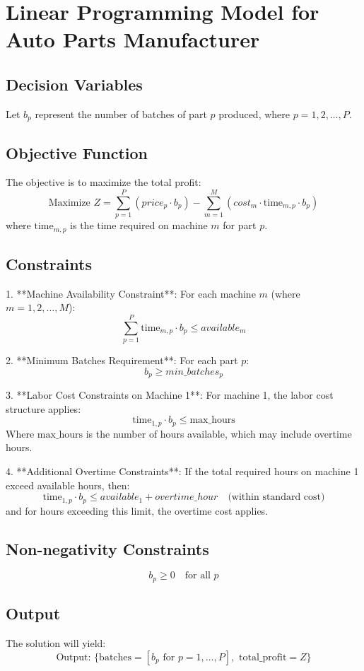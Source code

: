 \documentclass{article}
\begin{document}
\section*{Linear Programming Model for Auto Parts Manufacturer}

\subsection*{Decision Variables}
Let \( b_p \) represent the number of batches of part \( p \) produced, where \( p = 1, 2, \ldots, P \).

\subsection*{Objective Function}
The objective is to maximize the total profit:
\[
\text{Maximize } Z = \sum_{p=1}^{P} (price_p \cdot b_p) - \sum_{m=1}^{M} (cost_m \cdot \text{time}_{m,p} \cdot b_p)
\]
where \( \text{time}_{m,p} \) is the time required on machine \( m \) for part \( p \).

\subsection*{Constraints}

1. **Machine Availability Constraint**: 
   For each machine \( m \) (where \( m = 1, 2, \ldots, M \)):
   \[
   \sum_{p=1}^{P} \text{time}_{m,p} \cdot b_p \leq available_m
   \]

2. **Minimum Batches Requirement**:
   For each part \( p \):
   \[
   b_p \geq min\_batches_p
   \]

3. **Labor Cost Constraints on Machine 1**:
   For machine 1, the labor cost structure applies:
   \[
   \text{time}_{1,p} \cdot b_p \leq \text{max\_hours}
   \]
   Where \(\text{max\_hours}\) is the number of hours available, which may include overtime hours.

4. **Additional Overtime Constraints**:
   If the total required hours on machine 1 exceed available hours, then:
   \[
   \text{time}_{1,p} \cdot b_p \leq available_1 + overtime\_hour \quad \text{(within standard cost)}
   \]
   and for hours exceeding this limit, the overtime cost applies.

\subsection*{Non-negativity Constraints}
\[
b_p \geq 0 \quad \text{for all } p
\]

\subsection*{Output}
The solution will yield:
\[
\text{Output: } \{ \text{batches} = [b_p \text{ for } p = 1, \ldots, P], \text{ total\_profit} = Z \} 
\]
\end{document}
